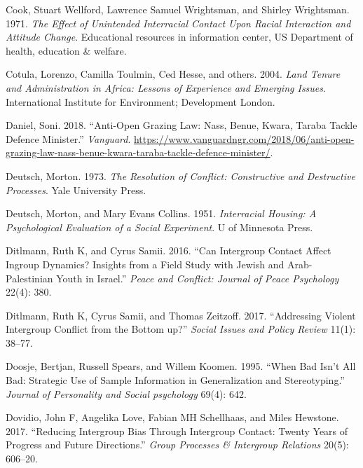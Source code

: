 \documentclass[11pt]{article}
\begin{document}
\leavevmode\hypertarget{ref-cook1971race}{}%
Cook, Stuart Wellford, Lawrence Samuel Wrightsman, and Shirley
Wrightsman. 1971. \emph{The Effect of Unintended Interracial Contact
Upon Racial Interaction and Attitude Change}. Educational resources in
information center, US Department of health, education \& welfare.

\leavevmode\hypertarget{ref-cotula2004land}{}%
Cotula, Lorenzo, Camilla Toulmin, Ced Hesse, and others. 2004.
\emph{Land Tenure and Administration in Africa: Lessons of Experience
and Emerging Issues}. International Institute for Environment;
Development London.

\leavevmode\hypertarget{ref-daniel2018anti}{}%
Daniel, Soni. 2018. ``Anti-Open Grazing Law: Nass, Benue, Kwara, Taraba
Tackle Defence Minister.'' \emph{Vanguard}.
\url{https://www.vanguardngr.com/2018/06/anti-open-grazing-law-nass-benue-kwara-taraba-tackle-defence-minister/}.

\leavevmode\hypertarget{ref-deutsch1973resolution}{}%
Deutsch, Morton. 1973. \emph{The Resolution of Conflict: Constructive
and Destructive Processes}. Yale University Press.

\leavevmode\hypertarget{ref-deutsch1951interracial}{}%
Deutsch, Morton, and Mary Evans Collins. 1951. \emph{Interracial
Housing: A Psychological Evaluation of a Social Experiment}. U of
Minnesota Press.

\leavevmode\hypertarget{ref-ditlmann2016can}{}%
Ditlmann, Ruth K, and Cyrus Samii. 2016. ``Can Intergroup Contact Affect
Ingroup Dynamics? Insights from a Field Study with Jewish and
Arab-Palestinian Youth in Israel.'' \emph{Peace and Conflict: Journal of
Peace Psychology} 22(4): 380.

\leavevmode\hypertarget{ref-ditlmann2017addressing}{}%
Ditlmann, Ruth K, Cyrus Samii, and Thomas Zeitzoff. 2017. ``Addressing
Violent Intergroup Conflict from the Bottom up?'' \emph{Social Issues
and Policy Review} 11(1): 38--77.

\leavevmode\hypertarget{ref-doosje1995bad}{}%
Doosje, Bertjan, Russell Spears, and Willem Koomen. 1995. ``When Bad
Isn't All Bad: Strategic Use of Sample Information in Generalization and
Stereotyping.'' \emph{Journal of Personality and Social psychology}
69(4): 642.

\leavevmode\hypertarget{ref-dovidio2017reducing}{}%
Dovidio, John F, Angelika Love, Fabian MH Schellhaas, and Miles
Hewstone. 2017. ``Reducing Intergroup Bias Through Intergroup Contact:
Twenty Years of Progress and Future Directions.'' \emph{Group Processes
\& Intergroup Relations} 20(5): 606--20.
\end{document}
